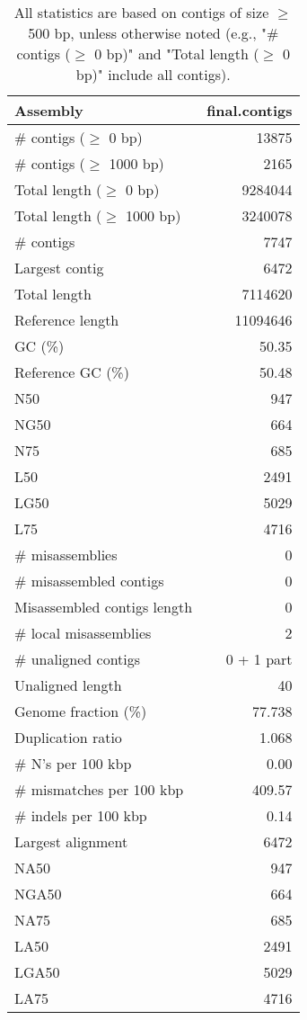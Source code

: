 \documentclass[12pt,a4paper]{article}
\begin{document}
\begin{table}[ht]
\begin{center}
\caption{All statistics are based on contigs of size $\geq$ 500 bp, unless otherwise noted (e.g., "\# contigs ($\geq$ 0 bp)" and "Total length ($\geq$ 0 bp)" include all contigs).}
\begin{tabular}{|l*{1}{|r}|}
\hline
Assembly & final.contigs \\ \hline
\# contigs ($\geq$ 0 bp) & 13875 \\ \hline
\# contigs ($\geq$ 1000 bp) & 2165 \\ \hline
Total length ($\geq$ 0 bp) & 9284044 \\ \hline
Total length ($\geq$ 1000 bp) & 3240078 \\ \hline
\# contigs & 7747 \\ \hline
Largest contig & 6472 \\ \hline
Total length & 7114620 \\ \hline
Reference length & 11094646 \\ \hline
GC (\%) & 50.35 \\ \hline
Reference GC (\%) & 50.48 \\ \hline
N50 & 947 \\ \hline
NG50 & 664 \\ \hline
N75 & 685 \\ \hline
L50 & 2491 \\ \hline
LG50 & 5029 \\ \hline
L75 & 4716 \\ \hline
\# misassemblies & 0 \\ \hline
\# misassembled contigs & 0 \\ \hline
Misassembled contigs length & 0 \\ \hline
\# local misassemblies & 2 \\ \hline
\# unaligned contigs & 0 + 1 part \\ \hline
Unaligned length & 40 \\ \hline
Genome fraction (\%) & 77.738 \\ \hline
Duplication ratio & 1.068 \\ \hline
\# N's per 100 kbp & 0.00 \\ \hline
\# mismatches per 100 kbp & 409.57 \\ \hline
\# indels per 100 kbp & 0.14 \\ \hline
Largest alignment & 6472 \\ \hline
NA50 & 947 \\ \hline
NGA50 & 664 \\ \hline
NA75 & 685 \\ \hline
LA50 & 2491 \\ \hline
LGA50 & 5029 \\ \hline
LA75 & 4716 \\ \hline
\end{tabular}
\end{center}
\end{table}
\end{document}
